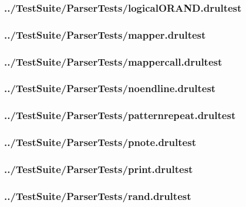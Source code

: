 \begin{changemargin}{-1in}{-1in}
\subsubsection{../TestSuite/ParserTests/logicalORAND.drultest}


\subsubsection{../TestSuite/ParserTests/mapper.drultest}


\subsubsection{../TestSuite/ParserTests/mappercall.drultest}


\subsubsection{../TestSuite/ParserTests/noendline.drultest}


\subsubsection{../TestSuite/ParserTests/patternrepeat.drultest}


\subsubsection{../TestSuite/ParserTests/pnote.drultest}


\subsubsection{../TestSuite/ParserTests/print.drultest}


\subsubsection{../TestSuite/ParserTests/rand.drultest}



\end{changemargin}
